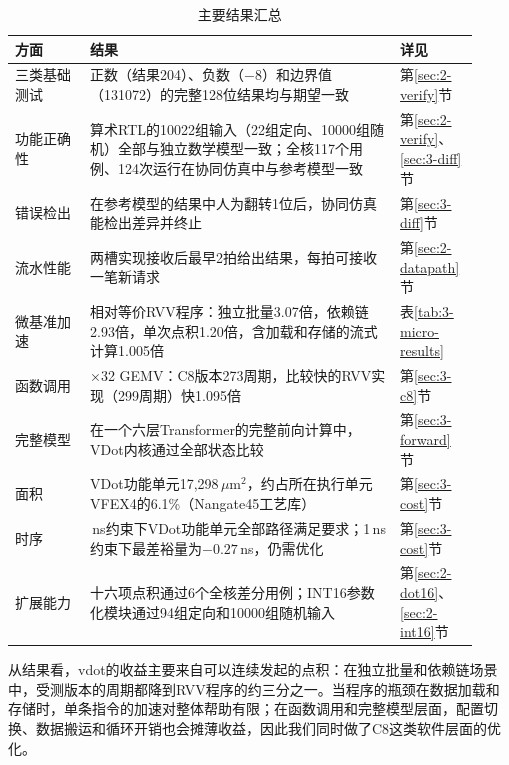 \begin{table}[!htbp]\centering
\small
\caption{主要结果汇总}\label{tab:0-results}
\begin{tabular}{>{\raggedright\arraybackslash}p{0.15\linewidth}>{\raggedright\arraybackslash}p{0.62\linewidth}>{\raggedright\arraybackslash}p{0.15\linewidth}}
\toprule
方面 & 结果 & 详见\\
\midrule
三类基础测试 & 正数（结果204）、负数（$-8$）和边界值（131072）的完整128位结果均与期望一致 & 第\ref{sec:2-verify}节\\
功能正确性 & 算术RTL的10022组输入（22组定向、10000组随机）全部与独立数学模型一致；全核117个用例、124次运行在协同仿真中与参考模型一致 & 第\ref{sec:2-verify}、\ref{sec:3-diff}节\\
错误检出 & 在参考模型的结果中人为翻转1位后，协同仿真能检出差异并终止 & 第\ref{sec:3-diff}节\\
流水性能 & 两槽实现接收后最早2拍给出结果，每拍可接收一笔新请求 & 第\ref{sec:2-datapath}节\\
微基准加速 & 相对等价RVV程序：独立批量3.07倍，依赖链2.93倍，单次点积1.20倍，含加载和存储的流式计算1.005倍 & 表\ref{tab:3-micro-results}\\
函数调用 & 8×32 GEMV：C8版本273周期，比较快的RVV实现（299周期）快1.095倍 & 第\ref{sec:3-c8}节\\
完整模型 & 在一个六层Transformer的完整前向计算中，VDot内核通过全部状态比较 & 第\ref{sec:3-forward}节\\
面积 & VDot功能单元17,298\,$\mu\mathrm{m}^{2}$，约占所在执行单元VFEX4的6.1\%（Nangate45工艺库） & 第\ref{sec:3-cost}节\\
时序 & 2\,ns约束下VDot功能单元全部路径满足要求；1\,ns约束下最差裕量为$-0.27$\,ns，仍需优化 & 第\ref{sec:3-cost}节\\
扩展能力 & 十六项点积通过6个全核差分用例；INT16参数化模块通过94组定向和10000组随机输入 & 第\ref{sec:2-dot16}、\ref{sec:2-int16}节\\
\bottomrule
\end{tabular}
\end{table}

从结果看，vdot的收益主要来自可以连续发起的点积：在独立批量和依赖链场景中，受测版本的周期都降到RVV程序的约三分之一。当程序的瓶颈在数据加载和存储时，单条指令的加速对整体帮助有限；在函数调用和完整模型层面，配置切换、数据搬运和循环开销也会摊薄收益，因此我们同时做了C8这类软件层面的优化。

